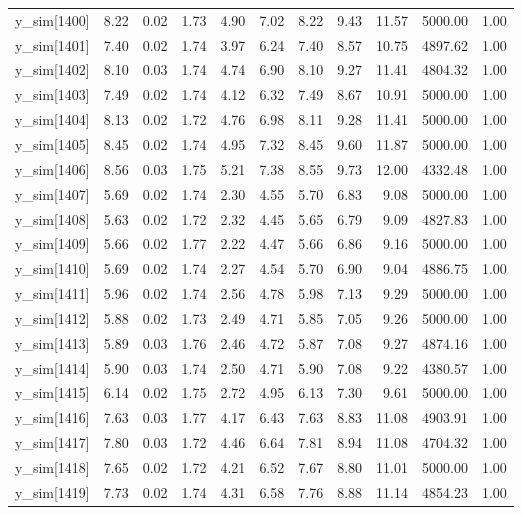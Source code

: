 \begin{table}[ht]
\begin{tabular}{rrrrrrrrrrr}
  y\_sim[1400] & 8.22 & 0.02 & 1.73 & 4.90 & 7.02 & 8.22 & 9.43 & 11.57 & 5000.00 & 1.00 \\ 
  y\_sim[1401] & 7.40 & 0.02 & 1.74 & 3.97 & 6.24 & 7.40 & 8.57 & 10.75 & 4897.62 & 1.00 \\ 
  y\_sim[1402] & 8.10 & 0.03 & 1.74 & 4.74 & 6.90 & 8.10 & 9.27 & 11.41 & 4804.32 & 1.00 \\ 
  y\_sim[1403] & 7.49 & 0.02 & 1.74 & 4.12 & 6.32 & 7.49 & 8.67 & 10.91 & 5000.00 & 1.00 \\ 
  y\_sim[1404] & 8.13 & 0.02 & 1.72 & 4.76 & 6.98 & 8.11 & 9.28 & 11.41 & 5000.00 & 1.00 \\ 
  y\_sim[1405] & 8.45 & 0.02 & 1.74 & 4.95 & 7.32 & 8.45 & 9.60 & 11.87 & 5000.00 & 1.00 \\ 
  y\_sim[1406] & 8.56 & 0.03 & 1.75 & 5.21 & 7.38 & 8.55 & 9.73 & 12.00 & 4332.48 & 1.00 \\ 
  y\_sim[1407] & 5.69 & 0.02 & 1.74 & 2.30 & 4.55 & 5.70 & 6.83 & 9.08 & 5000.00 & 1.00 \\ 
  y\_sim[1408] & 5.63 & 0.02 & 1.72 & 2.32 & 4.45 & 5.65 & 6.79 & 9.09 & 4827.83 & 1.00 \\ 
  y\_sim[1409] & 5.66 & 0.02 & 1.77 & 2.22 & 4.47 & 5.66 & 6.86 & 9.16 & 5000.00 & 1.00 \\ 
  y\_sim[1410] & 5.69 & 0.02 & 1.74 & 2.27 & 4.54 & 5.70 & 6.90 & 9.04 & 4886.75 & 1.00 \\ 
  y\_sim[1411] & 5.96 & 0.02 & 1.74 & 2.56 & 4.78 & 5.98 & 7.13 & 9.29 & 5000.00 & 1.00 \\ 
  y\_sim[1412] & 5.88 & 0.02 & 1.73 & 2.49 & 4.71 & 5.85 & 7.05 & 9.26 & 5000.00 & 1.00 \\ 
  y\_sim[1413] & 5.89 & 0.03 & 1.76 & 2.46 & 4.72 & 5.87 & 7.08 & 9.27 & 4874.16 & 1.00 \\ 
  y\_sim[1414] & 5.90 & 0.03 & 1.74 & 2.50 & 4.71 & 5.90 & 7.08 & 9.22 & 4380.57 & 1.00 \\ 
  y\_sim[1415] & 6.14 & 0.02 & 1.75 & 2.72 & 4.95 & 6.13 & 7.30 & 9.61 & 5000.00 & 1.00 \\ 
  y\_sim[1416] & 7.63 & 0.03 & 1.77 & 4.17 & 6.43 & 7.63 & 8.83 & 11.08 & 4903.91 & 1.00 \\ 
  y\_sim[1417] & 7.80 & 0.03 & 1.72 & 4.46 & 6.64 & 7.81 & 8.94 & 11.08 & 4704.32 & 1.00 \\ 
  y\_sim[1418] & 7.65 & 0.02 & 1.72 & 4.21 & 6.52 & 7.67 & 8.80 & 11.01 & 5000.00 & 1.00 \\ 
  y\_sim[1419] & 7.73 & 0.02 & 1.74 & 4.31 & 6.58 & 7.76 & 8.88 & 11.14 & 4854.23 & 1.00 \\ 

\end{tabular}
\end{table}
